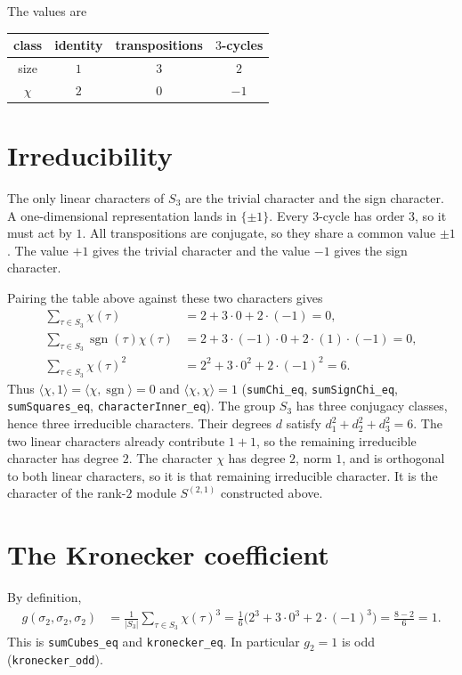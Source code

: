 \documentclass[11pt]{article}
\begin{document}
The values are
\begin{center}
\begin{tabular}{c|ccc}
class & identity & transpositions & \(3\)-cycles\\
\hline
size & \(1\) & \(3\) & \(2\)\\
\(\chi\) & \(2\) & \(0\) & \(-1\)
\end{tabular}
\end{center}

\section{Irreducibility}
The only linear characters of \(S_3\) are the trivial character and the sign character. A one-dimensional representation lands in \(\{\pm 1\}\). Every \(3\)-cycle has order \(3\), so it must act by \(1\). All transpositions are conjugate, so they share a common value \(\pm 1\). The value \(+1\) gives the trivial character and the value \(-1\) gives the sign character.

Pairing the table above against these two characters gives
\begin{align*}
\sum_{\tau\in S_3}\chi(\tau)
&=2+3\cdot 0+2\cdot(-1)=0,\\
\sum_{\tau\in S_3}\operatorname{sgn}(\tau)\chi(\tau)
&=2+3\cdot(-1)\cdot 0+2\cdot(1)\cdot(-1)=0,\\
\sum_{\tau\in S_3}\chi(\tau)^2
&=2^2+3\cdot 0^2+2\cdot(-1)^2=6.
\end{align*}
Thus \(\langle\chi,1\rangle=\langle\chi,\operatorname{sgn}\rangle=0\) and \(\langle\chi,\chi\rangle=1\)
(\texttt{sumChi\_eq}, \texttt{sumSignChi\_eq}, \texttt{sumSquares\_eq}, \texttt{characterInner\_eq}).
The group \(S_3\) has three conjugacy classes, hence three irreducible characters. Their degrees \(d\) satisfy \(d_1^2+d_2^2+d_3^2=6\). The two linear characters already contribute \(1+1\), so the remaining irreducible character has degree \(2\). The character \(\chi\) has degree \(2\), norm \(1\), and is orthogonal to both linear characters, so it is that remaining irreducible character. It is the character of the rank-\(2\) module \(S^{(2,1)}\) constructed above.

\section{The Kronecker coefficient}
By definition,
\begin{align*}
g(\sigma_2,\sigma_2,\sigma_2)
&=\frac1{|S_3|}\sum_{\tau\in S_3}\chi(\tau)^3
=\frac1{6}\bigl(2^3+3\cdot 0^3+2\cdot(-1)^3\bigr)
=\frac{8-2}{6}=1.
\end{align*}
This is \texttt{sumCubes\_eq} and \texttt{kronecker\_eq}. In particular \(g_2=1\) is odd (\texttt{kronecker\_odd}).
\end{document}
